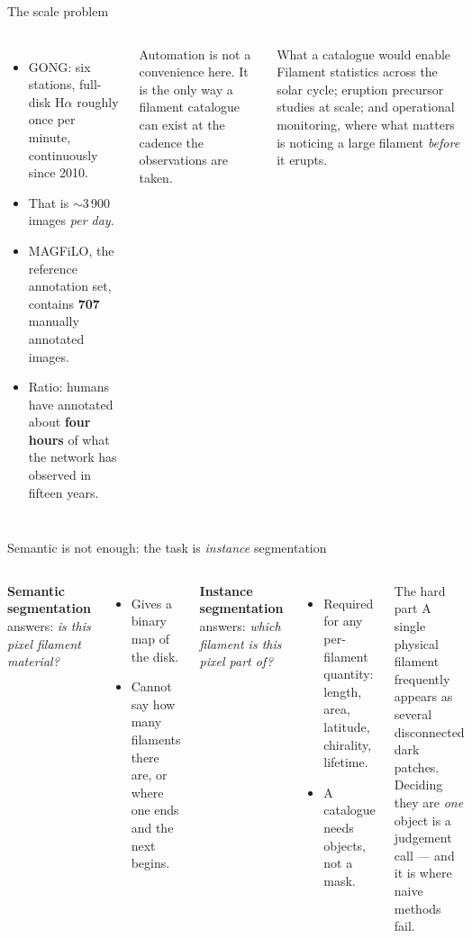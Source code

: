 \documentclass[aspectratio=169,xcolor=dvipsnames]{beamer}
\begin{document}
\begin{frame}{The scale problem}
  \begin{columns}
      \begin{itemize}
        \item GONG: six stations, full-disk H$\alpha$ roughly once per minute, continuously since 2010.
        \item That is $\sim$3\,900 images \emph{per day}.
        \item MAGFiLO, the reference annotation set, contains \textbf{707} manually annotated images.
        \item Ratio: humans have annotated about \textbf{four hours} of what the network has observed in fifteen years.
      \end{itemize}
      \vspace{0.3cm}
      \small{Automation is not a convenience here. It is the only way a filament catalogue can exist at the cadence the observations are taken.}
      \begin{block}{What a catalogue would enable}
        \small
        Filament statistics across the solar cycle; eruption precursor studies at scale; and operational monitoring, where what matters is noticing a large filament \emph{before} it erupts.
      \end{block}
  \end{columns}
\end{frame}

\begin{frame}{Semantic is not enough: the task is \emph{instance} segmentation}
  \begin{columns}
      \textbf{Semantic segmentation} answers: \emph{is this pixel filament material?}
      \begin{itemize}\small
        \item Gives a binary map of the disk.
        \item Cannot say how many filaments there are, or where one ends and the next begins.
      \end{itemize}
      \vspace{0.3cm}
      \textbf{Instance segmentation} answers: \emph{which filament is this pixel part of?}
      \begin{itemize}\small
        \item Required for any per-filament quantity: length, area, latitude, chirality, lifetime.
        \item A catalogue needs objects, not a mask.
      \end{itemize}
      \begin{alertblock}{The hard part}
        \small A single physical filament frequently appears as several disconnected dark patches. Deciding they are \emph{one} object is a judgement call --- and it is where naive methods fail.
      \end{alertblock}
  \end{columns}
\end{frame}
\end{document}
